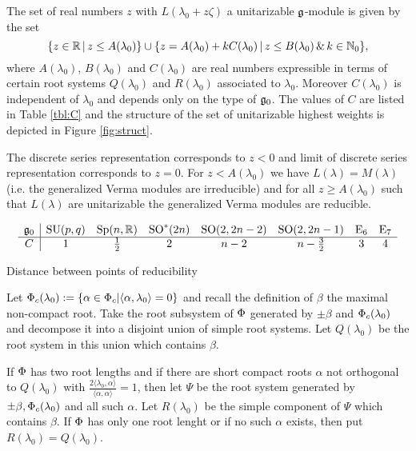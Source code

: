 \begin{theorem}
 The set of real numbers $z$ with $L(\lambda_0 + z\zeta)$ a unitarizable $\mathfrak{g}$-module is given by the set
\[
  \{z \in \mathbb{R}\, |\, z \leq A(\lambda_0)\} \cup \{ z=A(\lambda_0) + k C(\lambda_0)\,|\, z \leq B(\lambda_0) \,\&\, k\in \mathbb{N}_0\},
\]
where $A(\lambda_0)$, $B(\lambda_0)$ and $C(\lambda_0)$ are real numbers expressible in terms of certain root systems $Q(\lambda_0)$ and $R(\lambda_0)$ associated to $\lambda_0$. Moreover $C(\lambda_0)$ is independent of $\lambda_0$ and depends only on the type of $\mathfrak{g}_0$. The values of $C$ are listed in Table \ref{tbl:C} and the structure of the set of unitarizable highest weights is depicted in Figure \ref{fig:struct}.

The discrete series representation corresponds to $z <0$ and limit of discrete series representation corresponds to $z=0$. For $z  < A(\lambda_0)$ we have $L(\lambda) = M(\lambda)$ (i.e. the generalized Verma modules are irreducible) and for all $z \geq A(\lambda_0)$ such that $L(\lambda)$ are unitarizable the generalized Verma modules are reducible.%

\begin{table}[h]\label{tbl:C}
\[\begin{array}{c|ccccccc}
\mathfrak{g}_0 & \mathrm{SU}(p,q) & \mathrm{Sp}(n,\mathbb{R}) & \mathrm{SO}^*(2n) & \mathrm{SO}(2,2n-2) & \mathrm{SO}(2,2n-1) & \mathrm{E}_6 & \mathrm{E}_7\\\hline
C & 1 & \frac{1}{2} & 2 & n-2 & n-\frac{3}{2} & 3 & 4
\end{array}\]\caption{Distance between points of reducibility}
\end{table}
\end{theorem}

Let $\Phi_c(\lambda_0) := \{ \alpha \in \Phi_c | \langle \alpha,\lambda_0 \rangle = 0 \}$ and recall the definition of $\beta$ the maximal non-compact root. Take the root subsystem of $\Phi$ generated by $\pm \beta$ and $\Phi_c(\lambda_0)$ and decompose it into a disjoint union of simple root systems. Let $Q(\lambda_0)$ be the root system in this union which contains $\beta$.

If $\Phi$ has two root lengths and if there are short compact roots $\alpha$ not orthogonal to $Q(\lambda_0)$ with $\frac{2 \langle \lambda_0,\alpha \rangle}{\langle \alpha, \alpha \rangle}  =1$, then let $\Psi$ be the root system generated by $\pm \beta, \Phi_c(\lambda_0)$ and all such $\alpha$. Let $R(\lambda_0)$ be the simple component of $\Psi$ which contains $\beta$. If $\Phi$ has only one root lenght or if no such $\alpha$ exists, then put $R(\lambda_0) = Q(\lambda_0)$.

